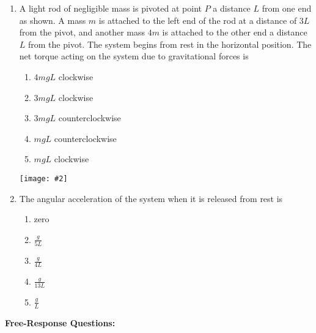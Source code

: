\documentclass[12pt]{article}
\newcommand{\pic}[2]{\texttt{[image: \#2]}}
\begin{document}
\begin{enumerate}[leftmargin=50pt,label=\underline{\hspace{0.4in}} \arabic*]
\item A light rod of negligible mass is pivoted at point $P$ a distance $L$ from
  one end as shown. A mass $m$ is attached to the left end of the rod at a
  distance of $3L$ from the pivot, and another mass $4m$ is attached to the
  other end a distance $L$ from the pivot. The system begins from rest in the
  horizontal position. The net torque acting on the system due to gravitational
  forces is
  
  \begin{minipage}{0.4\textwidth}
    \begin{enumerate}[noitemsep,topsep=0pt]
    \item $4mgL$ clockwise
    \item $3mgL$ clockwise
    \item $3mgL$ counterclockwise
    \item $mgL$ counterclockwise
    \item $mgL$ clockwise
    \end{enumerate}
  \end{minipage}
  \begin{minipage}{0.5\textwidth}
    \pic{1}{light-rod2.png}
  \end{minipage}

\item The angular acceleration of the system when it is released from rest is
  \begin{enumerate}[noitemsep,topsep=0pt]
  \item zero
  \item $\displaystyle\frac{g}{5L}$
  \item $\displaystyle\frac{g}{4L}$
  \item $\displaystyle\frac{g}{13L}$
  \item  $\displaystyle\frac{g}{L}$
  \end{enumerate}
\end{enumerate}

\newpage
\noindent\textbf{Free-Response Questions:}
\end{document}
